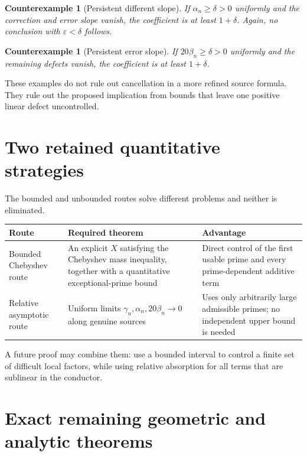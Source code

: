 \documentclass[11pt]{amsart}
\newtheorem{counterexample}[theorem]{Counterexample}
\theoremstyle{definition}
\theoremstyle{remark}
\newcommand{\eps}{\varepsilon}
\begin{document}
\begin{counterexample}[Persistent different slope]
If $\alpha_n\ge\delta>0$ uniformly and the correction and error slope vanish,
the coefficient is at least $1+\delta$.  Again, no conclusion with
$\eps<\delta$ follows.
\end{counterexample}

\begin{counterexample}[Persistent error slope]
If $20\beta_n\ge\delta>0$ uniformly and the remaining defects vanish, the
coefficient is at least $1+\delta$.
\end{counterexample}

These examples do not rule out cancellation in a more refined source formula.
They rule out the proposed implication from bounds that leave one positive
linear defect uncontrolled.

\section{Two retained quantitative strategies}

The bounded and unbounded routes solve different problems and neither is
eliminated.

\begin{center}
\begin{tabularx}{\textwidth}{@{}lXX@{}}
\toprule
Route & Required theorem & Advantage \\
\midrule
Bounded Chebyshev route & An explicit $X$ satisfying the Chebyshev mass
inequality, together with a quantitative exceptional-prime bound & Direct
control of the first usable prime and every prime-dependent additive term \\
\addlinespace
Relative asymptotic route & Uniform limits
$\gamma_n,\alpha_n,20\beta_n\to0$ along genuine sources & Uses only
arbitrarily large admissible primes; no independent upper bound is needed \\
\bottomrule
\end{tabularx}
\end{center}

A future proof may combine them: use a bounded interval to control a finite
set of difficult local factors, while using relative absorption for all terms
that are sublinear in the conductor.

\section{Exact remaining geometric and analytic theorems}
\end{document}
